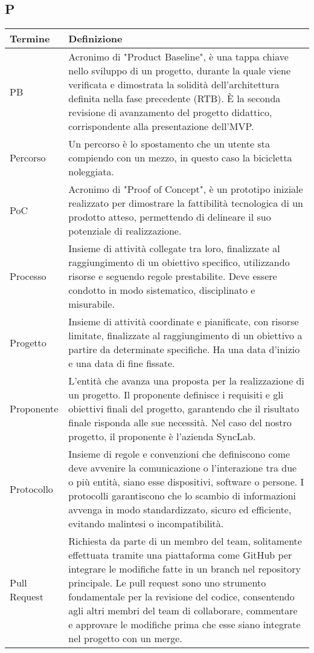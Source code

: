 \documentclass[10pt]{article}
\begin{document}
\subsection{P} %
\begin{longtable}{|>{\centering\arraybackslash}m{2.5cm}|>{\arraybackslash}m{12.5cm}|}
\hline
\rowcolor[gray]{0.8}
\textbf{Termine} & \textbf{Definizione}\\
\endhead
\hline
PB & Acronimo di "Product Baseline", è una tappa chiave nello sviluppo di un progetto, durante la quale viene verificata e dimostrata la solidità dell’architettura definita nella fase precedente (RTB). È la seconda revisione di avanzamento del progetto didattico, corrispondente alla presentazione dell'MVP.\\
\hline
Percorso & Un percorso è lo spostamento che un utente sta compiendo con un mezzo, in questo caso la bicicletta noleggiata.\\
\hline
PoC & Acronimo di "Proof of Concept", è un prototipo iniziale realizzato per dimostrare la fattibilità tecnologica di un prodotto atteso, permettendo di delineare il suo potenziale di realizzazione.\\
\hline
Processo & Insieme di attività collegate tra loro, finalizzate al raggiungimento di un obiettivo specifico, utilizzando risorse e seguendo regole prestabilite. Deve essere condotto in modo sistematico, disciplinato e misurabile.\\
\hline
Progetto & Insieme di attività coordinate e pianificate, con risorse limitate, finalizzate al raggiungimento di un obiettivo a partire da determinate specifiche. Ha una data d'inizio e una data di fine fissate.\\
\hline
Proponente & L'entità che avanza una proposta per la realizzazione di un progetto. Il proponente definisce i requisiti e gli obiettivi finali del progetto, garantendo che il risultato finale risponda alle sue necessità. Nel caso del nostro progetto, il proponente è l'azienda SyncLab.\\
\hline
Protocollo & Insieme di regole e convenzioni che definiscono come deve avvenire la comunicazione o l'interazione tra due o più entità, siano esse dispositivi, software o persone. I protocolli garantiscono che lo scambio di informazioni avvenga in modo standardizzato, sicuro ed efficiente, evitando malintesi o incompatibilità.\\
\hline
Pull Request & Richiesta da parte di un membro del team, solitamente effettuata tramite una piattaforma come GitHub per integrare le modifiche fatte in un branch nel repository principale. Le pull request sono uno strumento fondamentale per la revisione del codice, consentendo agli altri membri del team di collaborare, commentare e approvare le modifiche prima che esse siano integrate nel progetto con un merge.\\

\end{longtable}
\end{document}

